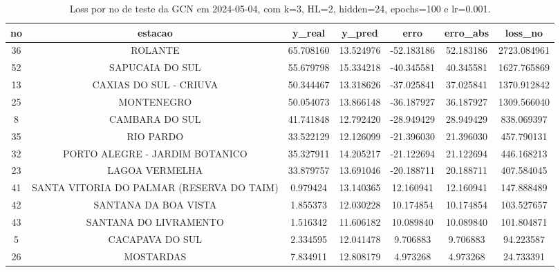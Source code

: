 \begin{table}[h]
\centering
\caption{Loss por no de teste da GCN em 2024-05-04, com k=3, HL=2, hidden=24, epochs=100 e lr=0.001.}
\label{tab:gcn_loss_k3_hl2_h24_e100_d20240504}
\begin{tabular}{ccccccc}
\toprule
no & estacao & y\_real & y\_pred & erro & erro\_abs & loss\_no \\
\midrule
36 & ROLANTE & 65.708160 & 13.524976 & -52.183186 & 52.183186 & 2723.084961 \\
52 & SAPUCAIA DO SUL & 55.679798 & 15.334218 & -40.345581 & 40.345581 & 1627.765869 \\
13 & CAXIAS DO SUL - CRIUVA & 50.344467 & 13.318626 & -37.025841 & 37.025841 & 1370.912842 \\
25 & MONTENEGRO & 50.054073 & 13.866148 & -36.187927 & 36.187927 & 1309.566040 \\
8 & CAMBARA DO SUL & 41.741848 & 12.792420 & -28.949429 & 28.949429 & 838.069397 \\
35 & RIO PARDO & 33.522129 & 12.126099 & -21.396030 & 21.396030 & 457.790131 \\
32 & PORTO ALEGRE - JARDIM BOTANICO & 35.327911 & 14.205217 & -21.122694 & 21.122694 & 446.168213 \\
23 & LAGOA VERMELHA & 33.879757 & 13.691046 & -20.188711 & 20.188711 & 407.584045 \\
41 & SANTA VITORIA DO PALMAR (RESERVA DO TAIM) & 0.979424 & 13.140365 & 12.160941 & 12.160941 & 147.888489 \\
42 & SANTANA DA BOA VISTA & 1.855373 & 12.030228 & 10.174854 & 10.174854 & 103.527657 \\
43 & SANTANA DO LIVRAMENTO & 1.516342 & 11.606182 & 10.089840 & 10.089840 & 101.804871 \\
5 & CACAPAVA DO SUL & 2.334595 & 12.041478 & 9.706883 & 9.706883 & 94.223587 \\
26 & MOSTARDAS & 7.834911 & 12.808179 & 4.973268 & 4.973268 & 24.733391 \\
\bottomrule
\end{tabular}
\end{table}
